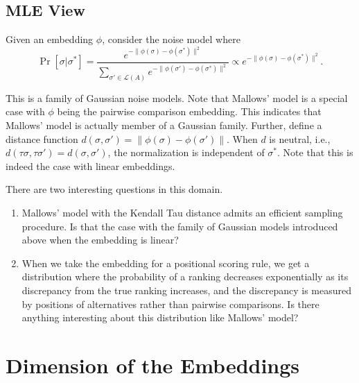 \documentclass[10pt,letterpaper]{article}
\newcommand{\calL}{{\mathcal{L}}}
\newcommand{\rank}{{\calL(A)}}
\begin{document}

\subsection{MLE View}
Given an embedding $\phi$, consider the noise model where 
$$
\Pr[\sigma | \sigma^*] = \frac{e^{-\|\phi(\sigma)-\phi(\sigma^*)\|^2}}{\sum_{\sigma' \in \rank} e^{-\|\phi(\sigma')-\phi(\sigma^*)\|^2}} \propto e^{-\|\phi(\sigma)-\phi(\sigma^*)\|^2}.
$$

This is a family of Gaussian noise models. Note that Mallows' model is a special case with $\phi$ being the pairwise comparison embedding. This indicates that Mallows' model is actually member of a Gaussian family. Further, define a distance function $d(\sigma,\sigma') = \|\phi(\sigma)-\phi(\sigma')\|$. When $d$ is neutral, i.e., $d(\tau \sigma,\tau \sigma') = d(\sigma,\sigma')$, the normalization is independent of $\sigma^*$. Note that this is indeed the case with linear embeddings. 

There are two interesting questions in this domain.
\begin{enumerate}
\item Mallows' model with the Kendall Tau distance admits an efficient sampling procedure. Is that the case with the family of Gaussian models introduced above when the embedding is linear? 
\item When we take the embedding for a positional scoring rule, we get a distribution where the probability of a ranking decreases exponentially as its discrepancy from the true ranking increases, and the discrepancy is measured by positions of alternatives rather than pairwise comparisons. Is there anything interesting about this distribution like Mallows' model?
\end{enumerate}


\section{Dimension of the Embeddings}
\label{sec:min-dim}
\end{document}
